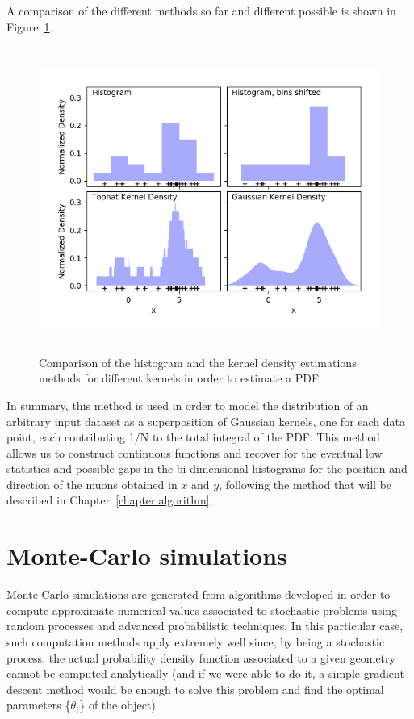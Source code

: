 \documentclass[a4paper, 11pt, twoside, openright]{report}
\begin{document}
A comparison of the different methods so far and different possible is shown in Figure~\ref{fig:KGR}.

\begin{figure}[htbp]
\centering
\includegraphics[width=13cm, height=10cm]{figs/kernels.png}
\caption{Comparison of the histogram and the kernel density estimations methods for different kernels in order to estimate a PDF \cite{scikit}.}
\label{fig:KGR}
\end{figure}

In summary, this method is used in order to model the distribution of an arbitrary input dataset as a superposition of Gaussian kernels, one for each data point, each contributing 1/N to the total integral of the PDF. This method allows us to construct continuous functions and recover for the eventual low statistics and possible gaps in the bi-dimensional histograms for the position and direction of the muons obtained in $x$ and $y$, following the method that will be described in Chapter~\ref{chapter:algorithm}.

\section{Monte-Carlo simulations} \label{sec:MC}

Monte-Carlo simulations are generated from algorithms developed in order to compute approximate numerical values associated to stochastic problems using random processes and advanced probabilistic techniques. In this particular case, such computation methods apply extremely well since, by being a stochastic process, the actual probability density function associated to a given geometry cannot be computed analytically (and if we were able to do it, a simple gradient descent method would be enough to solve this problem and find the optimal parameters \{$\theta_i$\} of the object). 
\end{document}
